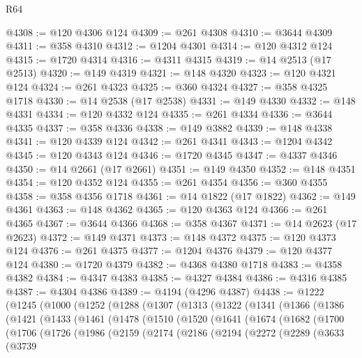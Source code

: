\begin{lexlean}{R64}
\begin{coremodule}
@4308 := @120 @4306 @124
@4309 := @261 @4308
@4310 := @3644 @4309
@4311 := @358 @4310
@4312 := @1204 @4301
@4314 := @120 @4312 @124
@4315 := @1720 @4314
@4316 := @4311 @4315
@4319 := @14 @2513 (@17 @2513)
@4320 := @149 @4319
@4321 := @148 @4320
@4323 := @120 @4321 @124
@4324 := @261 @4323
@4325 := @360 @4324
@4327 := @358 @4325 @1718
@4330 := @14 @2538 (@17 @2538)
@4331 := @149 @4330
@4332 := @148 @4331
@4334 := @120 @4332 @124
@4335 := @261 @4334
@4336 := @3644 @4335
@4337 := @358 @4336
@4338 := @149 @3882
@4339 := @148 @4338
@4341 := @120 @4339 @124
@4342 := @261 @4341
@4343 := @1204 @4342
@4345 := @120 @4343 @124
@4346 := @1720 @4345
@4347 := @4337 @4346
@4350 := @14 @2661 (@17 @2661)
@4351 := @149 @4350
@4352 := @148 @4351
@4354 := @120 @4352 @124
@4355 := @261 @4354
@4356 := @360 @4355
@4358 := @358 @4356 @1718
@4361 := @14 @1822 (@17 @1822)
@4362 := @149 @4361
@4363 := @148 @4362
@4365 := @120 @4363 @124
@4366 := @261 @4365
@4367 := @3644 @4366
@4368 := @358 @4367
@4371 := @14 @2623 (@17 @2623)
@4372 := @149 @4371
@4373 := @148 @4372
@4375 := @120 @4373 @124
@4376 := @261 @4375
@4377 := @1204 @4376
@4379 := @120 @4377 @124
@4380 := @1720 @4379
@4382 := @4368 @4380 @1718
@4383 := @4358 @4382
@4384 := @4347 @4383
@4385 := @4327 @4384
@4386 := @4316 @4385
@4387 := @4304 @4386
@4389 := @4194 (@4296 @4387)
@4438 := @1222
    (@1245
      (@1000
        (@1252
          (@1288
            (@1307
              (@1313
                (@1322
                  (@1341
                    (@1366
                      (@1386
                        (@1421
                          (@1433
                            (@1461
                              (@1478
                                (@1510
                                  (@1520
                                    (@1641
                                      (@1674
                                        (@1682
                                          (@1700
                                            (@1706
                                              (@1726
                                                (@1986
                                                  (@2159
                                                    (@2174
                                                      (@2186
                                                        (@2194
                                                          (@2272
                                                            (@2289
                                                              (@3633
                                                                (@3739

\end{coremodule}
\end{lexlean}
